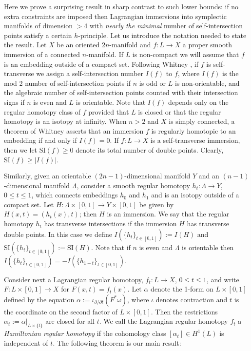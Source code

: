 \documentclass[reqno,11pt]{amsart}
\numberwithin{equation}{section}
\theoremstyle{my}
\theoremstyle{my}
\theoremstyle{your}
\newcommand{\pa}{\partial}
\newcommand{\SI}{\mathrm{SI}}
\begin{document}
Here we prove a surprising result in sharp contrast to such lower bounds: if no extra constraints are imposed then Lagrangian immersions into symplectic manifolds of dimension $>4$ with \emph{nearly the minimal} number of self-intersection points satisfy a certain $h$-principle. Let us  introduce the  notation
needed to state the result. Let $X$ be an oriented  $2n$-manifold and $f\colon L\to X$   a  proper smooth immersion of a   connected $n$-manifold. If $L$ is non-compact we will assume that $f$ is an embedding outside of a compact set. Following Whitney \cite{Whitney}, if $f$ is self-transverse we assign a self-intersection number $I({f})$ to $f$, where $I({f})$ is the mod 2 number of self-intersection points if $n$ is odd  or $L$  is non-orientable, and the algebraic number of self-intersection points counted with their intersection signs if $n$ is even and $L$ is orientable. Note that $I(f)$ depends only on the regular homotopy class of $f$ provided that $L$ is closed or that the regular homotopy is an isotopy at infinity. When $n>2$  and $X$ is simply connected, a theorem of Whitney \cite{Whitney} asserts that  an immersion $f$ is regularly homotopic to an embedding if and only if $I(f)=0$.
If $f\colon L\to X$ is a self-transverse immersion, then we let $\SI(f)\ge 0$ denote its total number of double points. Clearly, $\SI(f)\geq |I(f)|$. 

Similarly, given an orientable $(2n-1)$-dimensional manifold $Y$ and an $(n-1)$-dimensional manifold $\Lambda$, consider a smooth regular homotopy $h_t\colon\Lambda\to Y$, $0\le t\le 1$, which  connects embeddings $h_0$ and $h_1$ and  is an isotopy outside of a compact set. Let $H\colon \Lambda\times[0,1]\to Y\times[0,1]$ be given by  $H(x,t)=(h_t(x), t)$; then $H$ is an immersion. We say that the regular homotopy $h_t$ has transverse intersections if the immersion $H$ has transverse double points. In this case we define $I(\{h_t\}_{t\in[0,1]}):=I(H)$ and $\SI(\{h_t\}_{t\in[0,1]}):=\SI(H)$. Note that if $n$ is even and $\Lambda$ is orientable then $I(\{h_t\}_{t\in[0,1]})=-I(\{h_{1-t}\}_{t\in[0,1]})$.

 Consider next a Lagrangian regular homotopy, $f_t\colon L\to X$, $0\le t\le 1$, and write $F\colon L\times[0,1]\to X$ for $F(x,t)=f_t(x)$. Let $\alpha$ denote the 1-form on $L\times[0,1]$ defined by the equation $\alpha:=\iota_{\pa/\pa t}(F^*\omega)$, where $\iota$ denotes contraction and $t$ is the coordinate on the second factor of $L\times[0,1]$. Then the restrictions $\alpha_t:=\alpha|_{L\times \{t\}}$ are closed for all $t$. We call the Lagrangian regular homotopy $f_t$ a \emph{Hamiltonian regular homotopy} if the cohomology class $[\alpha_t]\in H^1(L)$ is independent of $t$. The following theorem is our main result:
\end{document}
